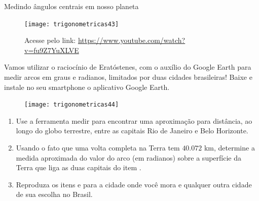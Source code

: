 \begin{task}{Medindo ângulos centrais em nosso planeta}
\begin{figure}[H]
\centering

\texttt{[image: trigonometricas43]}

\caption{Acesse pelo link: \url{https://www.youtube.com/watch?v=fu9Z7YuXLVE}}
\end{figure}

Vamos utilizar o raciocínio de Eratóstenes, com o auxílio do Google Earth para medir arcos em graus e radianos, limitados por duas cidades brasileiras! Baixe e instale no seu smartphone o aplicativo Google Earth.


\begin{figure}[H]
\centering

\texttt{[image: trigonometricas44]}
\end{figure}

\begin{enumerate}
\item Use a ferramenta medir para encontrar uma aproximação para distância, ao longo do globo terrestre, entre as capitais Rio de Janeiro e Belo Horizonte.
\item Usando o fato que uma volta completa na Terra tem $40.072$ km, determine a medida aproximada do valor do arco (em radianos) sobre a superfície da Terra que liga as duas capitais do item .
\item Reproduza os itens  e  para a cidade onde você mora e qualquer outra cidade de sua escolha no Brasil.
\end{enumerate}
\end{task}

\label{trig-exp3}

